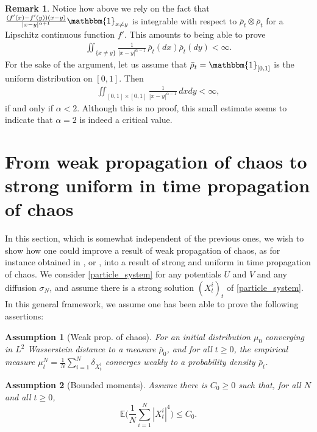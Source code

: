 \documentclass[JEP,XML,SOM,Unicode,published]{cedram}
\let\mathds\mathbbm
\theoremstyle{plain}
\newtheorem{assumption}{Assumption}
\theoremstyle{definition}
\newtheorem{remark}{Remark}[section]
\begin{document}
\begin{remark}
Notice how above we rely on the fact that $\frac{(f'(x)-f'(y))(x-y)}{|x-y|^{\alpha+1}}\mathds{1}_{x\neq y}$ is integrable with respect to $\bar{\rho}_t\otimes\bar{\rho}_t$ for a Lipschitz continuous function $f'$. This amounts to being able to prove
\begin{align*}
\iint_{\{x\neq y\}}\frac{1}{|x-y|^{\alpha-1}}\,\bar{\rho}_t(dx)\bar{\rho}_t(dy)<\infty.
\end{align*}
For the sake of the argument, let us assume that $\bar{\rho}_t=\mathds{1}_{[0,1]}$ is the uniform distribution on $[0,1]$. Then
\begin{align*}
\iint_{[0,1]\times[0,1]}\frac{1}{|x-y|^{\alpha-1}}\,dxdy<\infty,
\end{align*}
if and only if $\alpha<2$. Although this is no proof, this small estimate seems to indicate that $\alpha=2$ is indeed a critical value.
\end{remark}

\section{From weak propagation of chaos to strong uniform in time propagation of chaos}\label{sec_from_weak_to_strong}

In this section, which is somewhat independent of the previous ones, we wish to show how one could improve a result of weak propagation of chaos, as for instance obtained in \cite{Rogers_Shi}, \cite{cepa_lepingle} or \cite{Li_Li_Xie}, into a result of strong and uniform in time propagation of chaos. We consider \eqref{particle_system} for any potentials $U$ and $V$ and any diffusion $\sigma_N$, and assume there is a strong solution $(X^i_t)_t$ of \eqref{particle_system}. In this general framework, we assume one has been able to prove the following assertions:

\begin{assumption}[Weak prop. of chaos]\label{Hyp_weak_prop}
For an initial distribution $\mu_0$ converging in $L^2$ Wasserstein distance to a measure $\bar{\rho}_0$, and for all $t\geq0$, the empirical measure ${\mu^N_t=\frac{1}{N}\sum_{i=1}^N\delta_{X^i_t}}$ converges weakly to a probability density $\bar{\rho}_t$.
\end{assumption}

\begin{assumption}[Bounded moments]\label{Hyp_bounded_moments}
Assume there is $C_0\geq0$ such that, for all $N$ and all $t\geq0$,
\[
\mathbb{E}\biggl(\frac{1}{N}\sum_{i=1}^N|X^i_t|^{4}\biggr)\leq C_0.
\]
\end{assumption}
\end{document}
